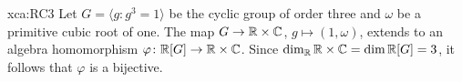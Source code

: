 \begin{sol}{xca:RC3}
Let $G=\langle g:g^3=1\rangle$ be the cyclic group of order three and $\omega$ be a primitive cubic root of one.  
The map $G\to \mathbb{R}\times\mathbb{C}$, $g\mapsto (1,\omega)$, extends to an algebra
homomorphism $\varphi\colon\mathbb{R}[G]\to\mathbb{R}\times\mathbb{C}$. Since 
$\dim_{\mathbb{R}}\mathbb{R}\times\mathbb{C}=\dim\mathbb{R}[G]=3$, it follows that $\varphi$ is a bijective. 
\end{sol}







